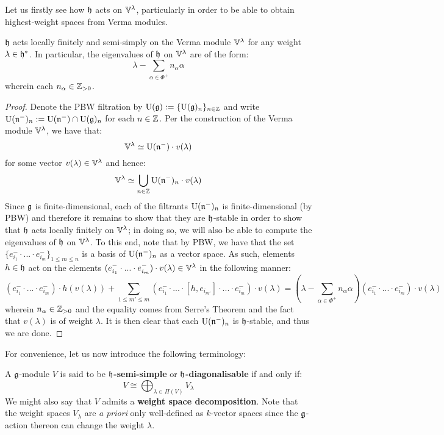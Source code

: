         Let us firstly see how $\mathfrak{h}$ acts on $\mathbb{V}^{\lambda}$, particularly in order to be able to obtain highest-weight spaces from Verma modules. 
        \begin{proposition} \label{prop: cartan_action_on_verma_modules}
            $\mathfrak{h}$ acts locally finitely and semi-simply on the Verma module $\mathbb{V}^{\lambda}$ for any weight $\lambda \in \mathfrak{h}^*$. In particular, the eigenvalues of $\mathfrak{h}$ on $\mathbb{V}^{\lambda}$ are of the form:
                $$\lambda - \sum_{\alpha \in \Phi^+} n_{\alpha} \alpha$$
            wherein each $n_{\alpha} \in \mathbb{Z}_{> 0}$.
        \end{proposition}
            \begin{proof}
                Denote the PBW filtration by $\mathrm{U}(\mathfrak{g}) := \{\mathrm{U}(\mathfrak{g})_n\}_{n \in \mathbb{Z}}$ and write $\mathrm{U}(\mathfrak{n}^-)_n := \mathrm{U}(\mathfrak{n}^-) \cap \mathrm{U}(\mathfrak{g})_n$ for each $n \in \mathbb{Z}$. Per the construction of the Verma module $\mathbb{V}^{\lambda}$, we have that:
                    $$\mathbb{V}^{\lambda} \simeq \mathrm{U}(\mathfrak{n}^-) \cdot v(\lambda)$$
                for some vector $v(\lambda) \in \mathbb{V}^{\lambda}$ and hence:
                    $$\mathbb{V}^{\lambda} \simeq \bigcup_{n \in \mathbb{Z}} \mathrm{U}(\mathfrak{n}^-)_n \cdot v(\lambda)$$
                Since $\mathfrak{g}$ is finite-dimensional, each of the filtrants $\mathrm{U}(\mathfrak{n}^-)_n$ is finite-dimensional (by PBW) and therefore it remains to show that they are $\mathfrak{h}$-stable in order to show that $\mathfrak{h}$ acts locally finitely on $\mathbb{V}^{\lambda}$; in doing so, we will also be able to compute the eigenvalues of $\mathfrak{h}$ on $\mathbb{V}^{\lambda}$. To this end, note that by PBW, we have that the set $\{ e_{i_1}^- \cdot ... \cdot e_{i_m}^- \}_{1 \leq m \leq n}$ is a basis of $\mathrm{U}(\mathfrak{n}^-)_n$ as a vector space. As such, elements $h \in \mathfrak{h}$ act on the elements $(e_{i_1}^- \cdot ... \cdot e_{i_m}^-) \cdot v(\lambda) \in \mathbb{V}^{\lambda}$ in the following manner:
                    $$(e_{i_1}^- \cdot ... \cdot e_{i_m}^-) \cdot h(v(\lambda)) + \sum_{1 \leq m' \leq m} (e_{i_1}^- \cdot ... \cdot [h, e_{i_{m'}}] \cdot ... \cdot e_{i_m}^-) \cdot v(\lambda) = (\lambda - \sum_{\alpha \in \Phi^+} n_{\alpha} \alpha) (e_{i_1}^- \cdot ... \cdot e_{i_m}^-) \cdot v(\lambda)$$
                wherein $n_{\alpha} \in \mathbb{Z}_{> 0}$ and the equality comes from Serre's Theorem and the fact that $v(\lambda)$ is of weight $\lambda$. It is then clear that each $\mathrm{U}(\mathfrak{n}^-)_n$ is $\mathfrak{h}$-stable, and thus we are done. 
            \end{proof}
        For convenience, let us now introduce the following terminology:
        \begin{definition} \label{def: cartan_semi_simple_modules}
            A $\mathfrak{g}$-module $V$ is said to be \textbf{$\mathfrak{h}$-semi-simple} or \textbf{$\mathfrak{h}$-diagonalisable} if and only if:
                $$V \cong \bigoplus_{\lambda \in \Pi(V)} V_{\lambda}$$
            We might also say that $V$ admits a \textbf{weight space decomposition}. Note that the weight spaces $ V_{\lambda}$ are \textit{a priori} only well-defined as $k$-vector spaces since the $\mathfrak{g}$-action thereon can change the weight $\lambda$. 
        \end{definition}
